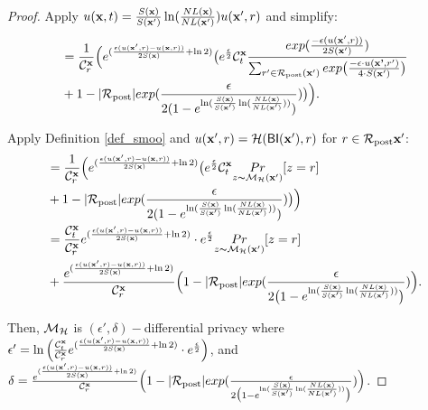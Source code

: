 \documentclass{article}
\begin{document}
\begin{proof}
      Apply $u(\textbf{x}, {t}) = \frac{S(\textbf{x})}{S(\textbf{x}')} \ln(\frac{NL(\textbf{x})}{NL(\textbf{x}')}) u(\textbf{x}', {r})$ and simplify:\\
      \begin{equation*}
      \begin{split}          
      & = \frac{1}{\mathcal{C}^{\textbf{x}}_{r}} \Big( e^{(\frac{\epsilon (u(\textbf{x}', {r}) - u(\textbf{x}, {r}))}{2 S(\textbf{x})} + \ln 2)} 
      \big( e^{\frac{\epsilon}{2}}
      \mathcal{C}^{\textbf{x}}_{t} \frac{exp(\frac{-\epsilon (u(\textbf{x}', {r}))}{2 S(\textbf{x}')})}{\sum_{r'\in \mathcal{R}_{\textup{post}}(\textbf{x}')} exp \big(\frac{-\epsilon\cdot u(\textbf{\textbf{x}'}, r')}{4 \cdot S(\textbf{x}')}\big)}\\
      & + 1 - |\mathcal{R}_{\textup{post}}|exp(\frac{\epsilon}{2 (1 - e ^ {\ln(\frac{S(\textbf{x})}{S(\textbf{x}')} \ln(\frac{NL(\textbf{x})}{NL(\textbf{x}')}))})}) 
      \big ) \Big).
       \end{split}
      \end{equation*}

      Apply Definition \ref{def_smoo} and $u(\textbf{x}', {r}) = \mathcal{H}(\mathsf{BI}(\textbf{x}'),r)$ for $r \in \mathcal{R}_{\textup{post}}{\textbf{x}'}$:\\
      \begin{equation*}
      \begin{split}          
      & = \frac{1}{\mathcal{C}^{\textbf{x}}_{r}} \Big( e^{(\frac{\epsilon (u(\textbf{x}', {r}) - u(\textbf{x}, {r}))}{2 S(\textbf{x})} + \ln 2)} 
      \big( e^{\frac{\epsilon}{2}}
      \mathcal{C}^{\textbf{x}}_{t}  \underset{z \thicksim \mathcal{M}_{\mathcal{H}}(\textbf{x}')}{Pr}[z = r] \\
      & + 1 - |\mathcal{R}_{\textup{post}}|exp(\frac{\epsilon}{2 (1 - e ^ {\ln(\frac{S(\textbf{x})}{S(\textbf{x}')} \ln(\frac{NL(\textbf{x})}{NL(\textbf{x}')}))})}) 
      \big ) \Big)\\
      & = \frac{\mathcal{C}^{\textbf{x}}_{t}}{\mathcal{C}^{\textbf{x}}_{r}} e^{(\frac{\epsilon (u(\textbf{x}', {r}) - u(\textbf{x}, {r}))}{2 S(\textbf{x})} + \ln 2)} \cdot e^{\frac{\epsilon}{2}}
      \underset{z \thicksim \mathcal{M}_{\mathcal{H}}(\textbf{x}')}{Pr}[z = r] \\
      & + \frac{e^{(\frac{\epsilon (u(\textbf{x}', {r}) - u(\textbf{x}, {r}))}{2 S(\textbf{x})} + \ln 2)}}{\mathcal{C}^{\textbf{x}}_{r}}
      \Big( 1 - |\mathcal{R}_{\textup{post}}|exp(\frac{\epsilon}{2 \big( 1 - e ^ {\ln(\frac{S(\textbf{x})}{S(\textbf{x}')} \ln(\frac{NL(\textbf{x})}{NL(\textbf{x}')}))} \big) }) \Big).
      \end{split}
      \end{equation*}

      Then, $\mathcal{M}_{\mathcal{H}}$ is $(\epsilon', \delta)-$differential privacy where $\epsilon' = \ln \Big( \frac{\mathcal{C}^{\textbf{x}}_{t}}{\mathcal{C}^{\textbf{x}}_{r}} e^{(\frac{\epsilon (u(\textbf{x}', {r}) - u(\textbf{x}, {r}))}{2 S(\textbf{x})} + \ln 2)} \cdot e^{\frac{\epsilon}{2}} \Big)$, and
      $\delta = \frac{e^{(\frac{\epsilon (u(\textbf{x}', {r}) - u(\textbf{x}, {r}))}{2 S(\textbf{x})} + \ln 2)}}{\mathcal{C}^{\textbf{x}}_{r}}
      \Big( 1 - |\mathcal{R}_{\textup{post}}|exp(\frac{\epsilon}{2 \big(1 - e ^ {\ln(\frac{S(\textbf{x})}{S(\textbf{x}')} \ln(\frac{NL(\textbf{x})}{NL(\textbf{x}')}))}\big)}) \Big)$.



\end{proof}
\end{document}
